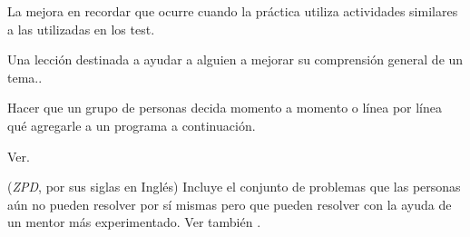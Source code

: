 \begin{description}
 La mejora en  recordar que ocurre cuando la práctica utiliza actividades similares a las utilizadas en los test.

 Una lección destinada a ayudar a alguien a 
mejorar su comprensión general de un tema..

Hacer que un grupo de personas decida momento a momento 
o línea por línea qué agregarle a un programa a continuación.

 Ver.

 (\emph{ZPD}, por sus siglas en Inglés) Incluye el conjunto de problemas que las personas aún no pueden resolver por sí mismas pero que pueden resolver con la ayuda de un mentor más experimentado.  Ver también .

\end{description}
